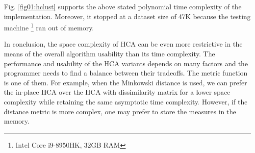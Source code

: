 Fig. \ref{fig01:hclust} supports the above stated polynomial time complexity of the implementation. Moreover, it stopped at a dataset size of 47K because the testing machine \footnote{Intel Core i9-8950HK, 32GB RAM} ran out of memory.

In conclusion, the space complexity of HCA can be even more restrictive in the means of the overall algorithm usability than its time complexity. The performance and usability of the HCA variants depends on many factors and the programmer needs to find a balance between their tradeoffs. The metric function is one of them. For example, when the Minkowski distance is used, we can prefer the in-place HCA over the HCA with dissimilarity matrix for a lower space complexity while retaining the same asymptotic time complexity. However, if the distance metric is more complex, one may prefer to store the measures in the memory.

